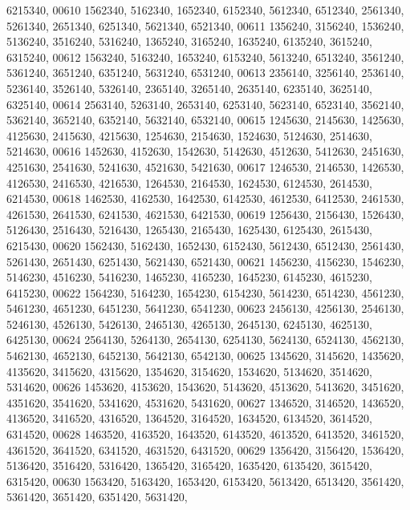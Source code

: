 \begin{DoxyCode}
      6215340,
00610       1562340, 5162340, 1652340, 6152340, 5612340, 6512340, 2561340, 5261340, 2651340, 6251340, 5621340, 
      6521340,
00611       1356240, 3156240, 1536240, 5136240, 3516240, 5316240, 1365240, 3165240, 1635240, 6135240, 3615240, 
      6315240,
00612       1563240, 5163240, 1653240, 6153240, 5613240, 6513240, 3561240, 5361240, 3651240, 6351240, 5631240, 
      6531240,
00613       2356140, 3256140, 2536140, 5236140, 3526140, 5326140, 2365140, 3265140, 2635140, 6235140, 3625140, 
      6325140,
00614       2563140, 5263140, 2653140, 6253140, 5623140, 6523140, 3562140, 5362140, 3652140, 6352140, 5632140, 
      6532140,
00615       1245630, 2145630, 1425630, 4125630, 2415630, 4215630, 1254630, 2154630, 1524630, 5124630, 2514630, 
      5214630,
00616       1452630, 4152630, 1542630, 5142630, 4512630, 5412630, 2451630, 4251630, 2541630, 5241630, 4521630, 
      5421630,
00617       1246530, 2146530, 1426530, 4126530, 2416530, 4216530, 1264530, 2164530, 1624530, 6124530, 2614530, 
      6214530,
00618       1462530, 4162530, 1642530, 6142530, 4612530, 6412530, 2461530, 4261530, 2641530, 6241530, 4621530, 
      6421530,
00619       1256430, 2156430, 1526430, 5126430, 2516430, 5216430, 1265430, 2165430, 1625430, 6125430, 2615430, 
      6215430,
00620       1562430, 5162430, 1652430, 6152430, 5612430, 6512430, 2561430, 5261430, 2651430, 6251430, 5621430, 
      6521430,
00621       1456230, 4156230, 1546230, 5146230, 4516230, 5416230, 1465230, 4165230, 1645230, 6145230, 4615230, 
      6415230,
00622       1564230, 5164230, 1654230, 6154230, 5614230, 6514230, 4561230, 5461230, 4651230, 6451230, 5641230, 
      6541230,
00623       2456130, 4256130, 2546130, 5246130, 4526130, 5426130, 2465130, 4265130, 2645130, 6245130, 4625130, 
      6425130,
00624       2564130, 5264130, 2654130, 6254130, 5624130, 6524130, 4562130, 5462130, 4652130, 6452130, 5642130, 
      6542130,
00625       1345620, 3145620, 1435620, 4135620, 3415620, 4315620, 1354620, 3154620, 1534620, 5134620, 3514620, 
      5314620,
00626       1453620, 4153620, 1543620, 5143620, 4513620, 5413620, 3451620, 4351620, 3541620, 5341620, 4531620, 
      5431620,
00627       1346520, 3146520, 1436520, 4136520, 3416520, 4316520, 1364520, 3164520, 1634520, 6134520, 3614520, 
      6314520,
00628       1463520, 4163520, 1643520, 6143520, 4613520, 6413520, 3461520, 4361520, 3641520, 6341520, 4631520, 
      6431520,
00629       1356420, 3156420, 1536420, 5136420, 3516420, 5316420, 1365420, 3165420, 1635420, 6135420, 3615420, 
      6315420,
00630       1563420, 5163420, 1653420, 6153420, 5613420, 6513420, 3561420, 5361420, 3651420, 6351420, 5631420, 

\end{DoxyCode}
